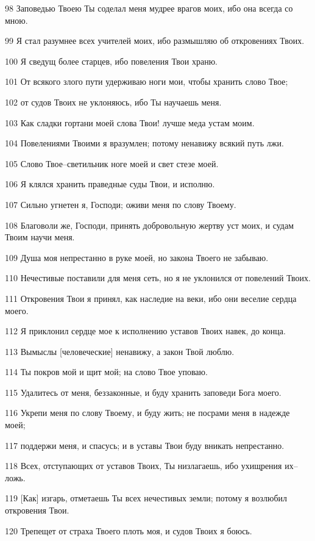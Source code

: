\par 98 Заповедью Твоею Ты соделал меня мудрее врагов моих, ибо она всегда со мною.
\par 99 Я стал разумнее всех учителей моих, ибо размышляю об откровениях Твоих.
\par 100 Я сведущ более старцев, ибо повеления Твои храню.
\par 101 От всякого злого пути удерживаю ноги мои, чтобы хранить слово Твое;
\par 102 от судов Твоих не уклоняюсь, ибо Ты научаешь меня.
\par 103 Как сладки гортани моей слова Твои! лучше меда устам моим.
\par 104 Повелениями Твоими я вразумлен; потому ненавижу всякий путь лжи.
\par 105 Слово Твое--светильник ноге моей и свет стезе моей.
\par 106 Я клялся хранить праведные суды Твои, и исполню.
\par 107 Сильно угнетен я, Господи; оживи меня по слову Твоему.
\par 108 Благоволи же, Господи, принять добровольную жертву уст моих, и судам Твоим научи меня.
\par 109 Душа моя непрестанно в руке моей, но закона Твоего не забываю.
\par 110 Нечестивые поставили для меня сеть, но я не уклонился от повелений Твоих.
\par 111 Откровения Твои я принял, как наследие на веки, ибо они веселие сердца моего.
\par 112 Я приклонил сердце мое к исполнению уставов Твоих навек, до конца.
\par 113 Вымыслы [человеческие] ненавижу, а закон Твой люблю.
\par 114 Ты покров мой и щит мой; на слово Твое уповаю.
\par 115 Удалитесь от меня, беззаконные, и буду хранить заповеди Бога моего.
\par 116 Укрепи меня по слову Твоему, и буду жить; не посрами меня в надежде моей;
\par 117 поддержи меня, и спасусь; и в уставы Твои буду вникать непрестанно.
\par 118 Всех, отступающих от уставов Твоих, Ты низлагаешь, ибо ухищрения их--ложь.
\par 119 [Как] изгарь, отметаешь Ты всех нечестивых земли; потому я возлюбил откровения Твои.
\par 120 Трепещет от страха Твоего плоть моя, и судов Твоих я боюсь.
